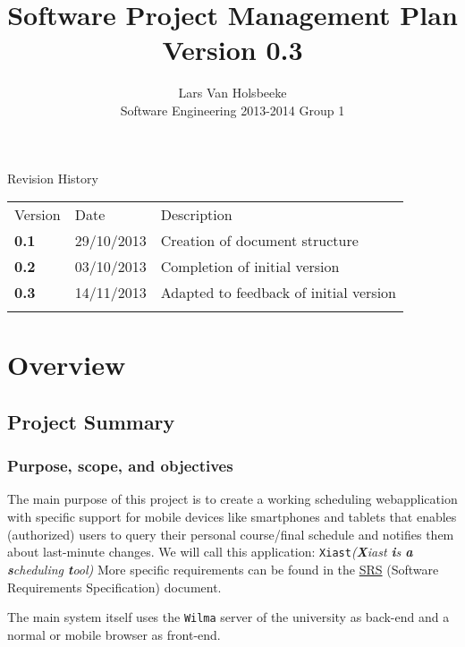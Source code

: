 \documentclass[9pt]{article}
\title{Software Project Management Plan\\Version 0.3}
\author{Lars Van Holsbeeke\\Software Engineering 2013-2014 Group 1}
\begin{document}
\begin{titlepage}
\maketitle

Revision History

\begin{longtable}[c]{@{}lll@{}}
\hline\noalign{\medskip}
Version & Date & Description
\\\noalign{\medskip}
\hline\noalign{\medskip}
\textbf{0.1} & 29/10/2013 & Creation of document structure
\\\noalign{\medskip}
\textbf{0.2} & 03/10/2013 & Completion of initial version
\\\noalign{\medskip}
\textbf{0.3} & 14/11/2013 & Adapted to feedback of initial version
\\\noalign{\medskip}
\hline
\end{longtable}

\end{titlepage}

\tableofcontents
\clearpage

\section{Overview}\label{overview}

\subsection{Project Summary}\label{project-summary}

\subsubsection{Purpose, scope, and
objectives}\label{purpose-scope-and-objectives}

The main purpose of this project is to create a working scheduling
webapplication with specific support for mobile devices like smartphones
and tablets that enables (authorized) users to query their personal
course/final schedule and notifies them about last-minute changes. We
will call this application: \texttt{Xiast}\emph{(\textbf{X}iast
\textbf{i}s \textbf{a} \textbf{s}cheduling \textbf{t}ool)} More specific
requirements can be found in the \hyperref[SRS]{SRS} (Software
Requirements Specification) document.

The main system itself uses the \texttt{Wilma} server of the university
as back-end and a normal or mobile browser as front-end.
\end{document}
